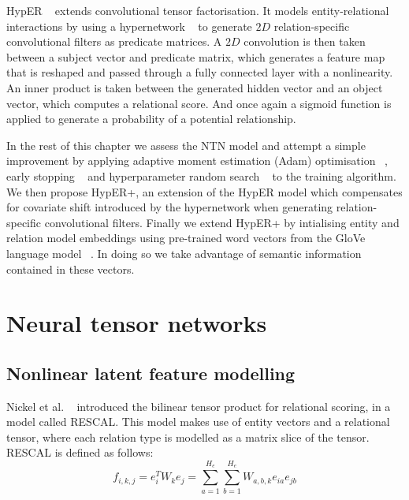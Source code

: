 \noindent HypER \unskip~\citep{balazevic2019hypernetwork} extends convolutional tensor factorisation. It models entity-relational interactions by using a hypernetwork \unskip~\citep{ha2016hypernetworks} to generate $ 2D $ relation-specific convolutional filters as predicate matrices. A $ 2D $ convolution is then taken between a subject vector and predicate matrix, which generates a feature map that is reshaped and passed through a fully connected layer with a nonlinearity. An inner product is taken between the generated hidden vector and an object vector, which computes a relational score. And once again a sigmoid function is applied to generate a probability of a potential relationship. \par

\noindent In the rest of this chapter we assess the NTN model and attempt a simple improvement by applying adaptive moment estimation (Adam) optimisation \unskip ~\citep{kingma2014adam}, early stopping \unskip ~\citep{prechelt1998early} and hyperparameter random search \unskip ~\citep{bergstra2012random} to the training algorithm. We then propose HypER+, an extension of the HypER model which compensates for covariate shift introduced by the hypernetwork when generating relation-specific convolutional filters. Finally we extend HypER+ by intialising entity and relation model embeddings using pre-trained word vectors from the GloVe language model \unskip ~\citep{pennington2014glove}. In doing so we take advantage of semantic information contained in these vectors. 



\section{Neural tensor networks}

\subsection{Nonlinear latent feature modelling}
Nickel et al. \unskip ~\citep{nickel2011three} introduced the bilinear tensor product for relational scoring, in a model called RESCAL. This model makes use of entity vectors and a relational tensor, where each relation type is modelled as a matrix slice of the tensor. RESCAL is defined as follows:
\begin{equation}
	f_{i, k, j} = e_i^TW_ke_j = \sum_{a=1}^{H_e}\sum_{b=1}^{H_e}W_{a,b,k}e_{ia}e_{jb}
\end{equation}


